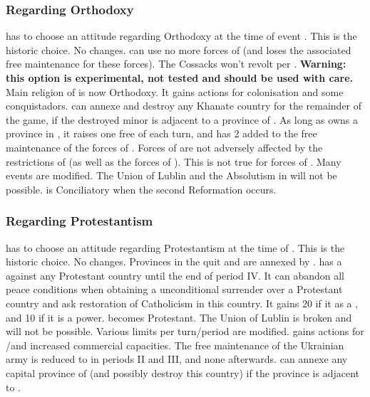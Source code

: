 \subsubsection{Regarding Orthodoxy}\label{chSpecific:Poland:Orthodoxy}
\aparag \POL has to choose an attitude regarding Orthodoxy at the time
of event .
 This is the historic choice. No
changes.
\bparag \POL can use no more forces of  (and loses the
associated free maintenance for these forces).
\bparag The Cossacks won't revolt per .
\textbf{Warning: this option is experimental, not tested and 
should be used with care.}
\bparag Main religion of \POL is now Orthodoxy. It gains actions for
colonisation and some conquistadors.
\bparag \POL can annexe and destroy any Khanate country for the
remainder of the game, if the destroyed minor is adjacent to a province
of \POL.
\bparag As long as \POL owns a province in , it raises one
free \LD of  each turn, and has 2 \LD added to the free
maintenance of the forces of .
\bparag Forces of  are not adversely affected by the
restrictions of  (as well as the forces
of ). This is not true for forces of .
\bparag Many events are modified. The Union of Lublin and the Absolutism
in \POL will not be possible. \POL is Conciliatory when the second
Reformation occurs.
\subsubsection{Regarding Protestantism}
\aparag \POL has to choose an attitude regarding Protestantism at the
time of .
 This is the historic choice. No changes.
\bparag Provinces in the  quit \POL and are
annexed by .
\bparag \POL has a \CB against any Protestant country until the end of
period IV.
\bparag It can abandon all peace conditions when obtaining a
unconditional surrender over a Protestant country and ask restoration of
Catholicism in this country.  It gains 20 \PV if it as a \MAJ, and 10\PV
if it is a \MIN power.
\aparag[Protestantism.] \POL becomes Protestant.
\bparag The Union of Lublin is broken and will not be possible.
\bparag Various limits per turn/period are modified. \POL gains actions
for \TP/\COL and increased commercial capacities.
\bparag The free maintenance of the Ukrainian army is reduced to \LD in
periods II and III, and none afterwards.
\bparag \POL can annexe any capital province of  (and
possibly destroy this country) if the province is adjacent to \POL.


